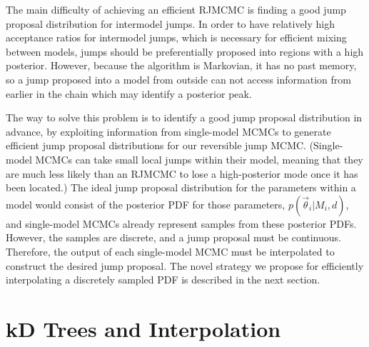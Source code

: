 \documentclass[prd,preprint]{revtex4}
\newcommand{\vtheta}{\vec{\theta}}
\newcommand{\ilya}[1]{{\color{red} \bf Ilya: #1}}
\begin{document}
The main difficulty of achieving an efficient RJMCMC is finding a good
jump proposal distribution for intermodel jumps.  In order to have
relatively high acceptance ratios for intermodel jumps, which is
necessary for efficient mixing between models, jumps should be
preferentially proposed into regions with a high posterior.  However,
because the algorithm is Markovian, it has no past memory, so a jump
proposed into a model from outside can not access information from
earlier in the chain which may identify a posterior peak.

The way to solve this problem is to identify a good jump proposal
distribution in advance, by exploiting information from single-model
MCMCs to generate efficient jump proposal distributions for our
reversible jump MCMC.  (Single-model MCMCs can take small local jumps
within their model, meaning that they are much less likely than an
RJMCMC to lose a high-posterior mode once it has been located.)  The
ideal jump proposal distribution for the parameters within a model
would consist of the posterior PDF for those parameters,
$p(\vtheta_i|M_i,d)$, and single-model MCMCs already represent samples
from these posterior PDFs.  However, the samples are discrete, and a
jump proposal must be continuous.  Therefore, the output of each
single-model MCMC must be interpolated to construct the desired jump
proposal.  The novel strategy we propose for efficiently interpolating
a discretely sampled PDF is described in the next section.

\section{kD Trees and Interpolation}
\label{sec:kDTree}

\end{document}
